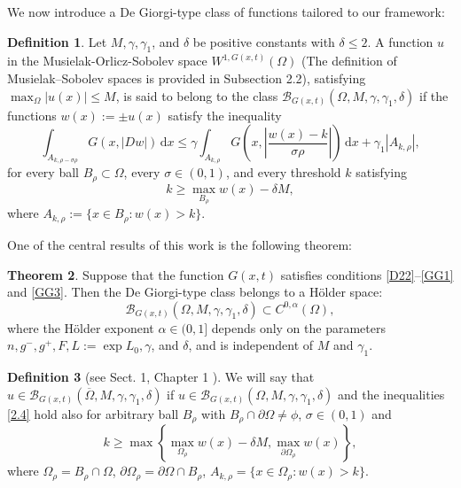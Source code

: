 \documentclass[10pt,reqno]{amsart}
\newcommand *\w{^\wedge}
\theoremstyle{definition}
\newtheorem{theorem}{Theorem}[section]
\newtheorem{definition}[theorem]{Definition}
\numberwithin{equation}{section}
\begin{document}
    
We now introduce a De Giorgi-type class of functions tailored to our framework:
\begin{definition}\label{Definition 2.1}
Let \( M, \gamma, \gamma_1 \), and \( \delta \) be positive constants with \( \delta \leq 2 \). A function \( u \) in the Musielak-Orlicz-Sobolev space \(W^{1,G(x,t)}(\Omega) \) (The definition of Musielak–Sobolev spaces is provided in Subsection 2.2), satisfying \( \max_{\Omega} |u(x)| \leq M \), is said to belong to the class \( \mathcal{B}_{G(x,t)}(\Omega, M, \gamma, \gamma_1, \delta) \) if the functions \( w(x) := \pm u(x) \) satisfy the inequality
\begin{equation}\label{2.4}
\int_{A_{k,\rho - \sigma \rho}} G(x,|Dw|) \, \mathrm{d}x \leq \gamma \int_{A_{k,\rho}} G\left(x,\left| \frac{w(x) - k}{\sigma \rho} \right|\right) \, \mathrm{d}x + \gamma_1 |A_{k,\rho}|,
\end{equation}
for every ball \( B_\rho \subset \Omega \), every \( \sigma \in (0,1) \), and every threshold \( k \) satisfying
\begin{equation}\label{2.5}
k \geq \max_{B_\rho} w(x) - \delta M,
\end{equation}
where \( A_{k,\rho} := \{x \in B_\rho : w(x) > k\} \).
\end{definition}
One of the central results of this work is the following theorem:
\begin{theorem}\label{Theorem 2.1}
Suppose that the function \( G(x,t) \) satisfies conditions \eqref{D22}--\eqref{GG1} and \eqref{GG3}. Then the De Giorgi-type class belongs to a Hölder space:
\[
\mathcal{B}_{G(x,t)}(\Omega, M, \gamma, \gamma_1, \delta) \subset C^{0,\alpha}(\Omega),
\]
where the Hölder exponent \( \alpha \in (0,1] \) depends only on the parameters \( n, g^-, g^+, F, L:=\exp{L_0}, \gamma \), and \( \delta \), and is independent of $M$ and \( \gamma_1 \).
\end{theorem}
\begin{definition}[see Sect. 1, Chapter 1 \cite{OL}]\label{Definition 2.3}
We will say that \(u \in \mathcal{B}_{G(x,t)}(\overline{\Omega}, M, \gamma, \gamma_1, \delta)\) if \(u \in \mathcal{B}_{G(x,t)}(\Omega, M, \gamma, \gamma_1, \delta)\) and the inequalities \eqref{2.4} hold also for arbitrary ball \(B_\rho\) with \(B_\rho \cap \partial \Omega \neq \phi\), \(\sigma \in (0, 1)\) and
\[
k \geq \max \left\{ \max_{\Omega_\rho} w(x) - \delta M, \max_{\partial \Omega_\rho} w(x) \right\},
\]
where \(\Omega_\rho = B_\rho \cap \Omega\), \(\partial \Omega_\rho = \partial \Omega \cap B_\rho\), \(A_{k, \rho} = \{x \in \Omega_\rho: w(x) > k\}\).
\end{definition}
\end{document}
